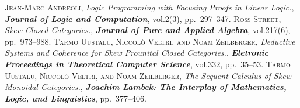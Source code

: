 \documentclass[bsl,meeting]{asl}
\begin{document}
\begin{thebibliography}{10}
{\scshape Jean-Marc Andreoli},
{\itshape Logic Programming with Focusing Proofs in Linear Logic.},
{\bfseries\itshape Journal of Logic and Computation},
vol.2(3), pp.~297--347.
{\scshape Ross Street},
{\itshape Skew-Closed Categories.},
{\bfseries\itshape Journal of Pure and Applied Algebra},
vol.217(6), pp.~973--988.
{\scshape Tarmo Uustalu, Niccol{\`o} Veltri, and Noam Zeilberger},
{\itshape Deductive Systems and Coherence for Skew
Prounital Closed Categories.},
{\bfseries\itshape Eletronic Proceedings in Theoretical Computer Science},
vol.332, pp.~35--53.
{\scshape Tarmo Uustalu, Niccol{\`o} Veltri, and Noam Zeilberger},
{\itshape The Sequent Calculus of Skew Monoidal Categories.},
{\bfseries\itshape Joachim Lambek: The Interplay of Mathematics,
Logic, and Linguistics}, pp.~377--406.
\end{thebibliography}


\vspace*{-0.5\baselineskip}
\end{document}
